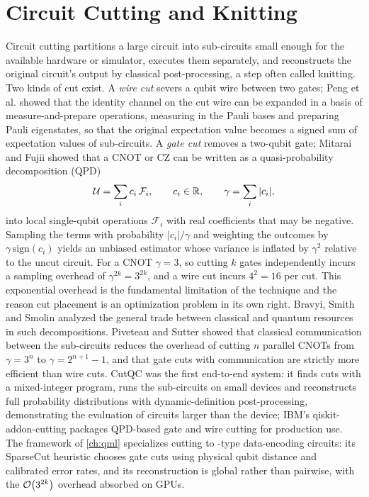 \section{Circuit Cutting and Knitting}\label{sec:bg:cutting}

Circuit cutting partitions a large circuit into sub-circuits small enough for the available hardware or simulator, executes them separately, and reconstructs the original circuit's output by classical post-processing, a step often called knitting. Two kinds of cut exist. A \emph{wire cut} severs a qubit wire between two gates; Peng et al. \cite{peng2020circuitcutting} showed that the identity channel on the cut wire can be expanded in a basis of measure-and-prepare operations, measuring in the Pauli bases and preparing Pauli eigenstates, so that the original expectation value becomes a signed sum of expectation values of sub-circuits. A \emph{gate cut} removes a two-qubit gate; Mitarai and Fujii \cite{mitarai2021virtualgate} showed that a CNOT or CZ can be written as a quasi-probability decomposition (QPD)
\begin{equation}\label{eq:bg:qpd}
\mathcal{U}=\sum_{i}c_i\,\mathcal{F}_i,\qquad c_i\in\mathbb{R},\qquad \gamma=\sum_{i}|c_i|,
\end{equation}
into local single-qubit operations $\mathcal{F}_i$ with real coefficients that may be negative. Sampling the terms with probability $|c_i|/\gamma$ and weighting the outcomes by $\gamma\,\mathrm{sign}(c_i)$ yields an unbiased estimator whose variance is inflated by $\gamma^2$ relative to the uncut circuit. For a CNOT $\gamma=3$, so cutting $k$ gates independently incurs a sampling overhead of $\gamma^{2k}=3^{2k}$, and a wire cut incurs $4^2=16$ per cut. This exponential overhead is the fundamental limitation of the technique and the reason cut placement is an optimization problem in its own right. Bravyi, Smith and Smolin \cite{bravyi2016trading} analyzed the general trade between classical and quantum resources in such decompositions. Piveteau and Sutter \cite{piveteau2024knitting} showed that classical communication between the sub-circuits reduces the overhead of cutting $n$ parallel CNOTs from $\gamma=3^{n}$ to $\gamma=2^{n+1}-1$, and that gate cuts with communication are strictly more efficient than wire cuts. CutQC \cite{tang2021cutqc} was the first end-to-end system: it finds cuts with a mixed-integer program, runs the sub-circuits on small devices and reconstructs full probability distributions with dynamic-definition post-processing, demonstrating the evaluation of circuits larger than the device; IBM's qiskit-addon-cutting packages QPD-based gate and wire cutting for production use. The \shardq{} framework of \cref{ch:qml} \cite{guo2025shardq} specializes cutting to \qcrank{}-type data-encoding circuits: its SparseCut heuristic chooses gate cuts using physical qubit distance and calibrated error rates, and its reconstruction is global rather than pairwise, with the $\mathcal{O}\!\left(3^{2k}\right)$ overhead absorbed on GPUs.

